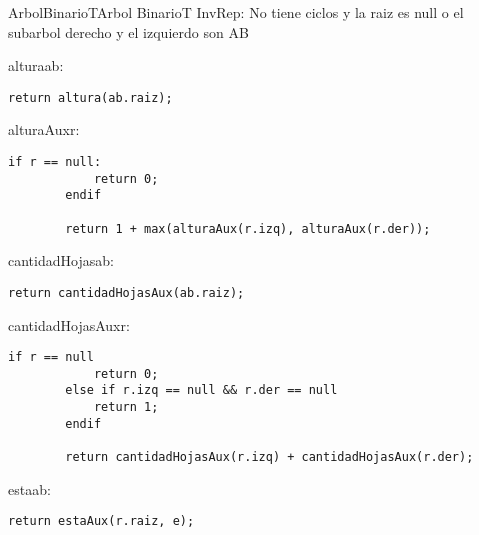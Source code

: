 \begin{module}{ArbolBinario}{T}{Arbol Binario}{T}
	\medskip
	InvRep: No tiene ciclos y la raiz es null o el subarbol derecho y el izquierdo son AB



	\begin{proc}{altura}{\In ab: \moduletype}{\Int}
		\begin{lstlisting}[numbers=none,frame=none]
		return altura(ab.raiz);
		\end{lstlisting}
	\end{proc}

	\begin{proc}{alturaAux}{\In r: \nodo}{\Int}
		\begin{lstlisting}[numbers=none,frame=none]
		if r == null:
			return 0;
		endif
	
		return 1 + max(alturaAux(r.izq), alturaAux(r.der));
		\end{lstlisting}
	\end{proc}

	\begin{proc}{cantidadHojas}{\In ab: \moduletype}{\Int}
		\begin{lstlisting}[numbers=none,frame=none]
		return cantidadHojasAux(ab.raiz);
		\end{lstlisting}
	\end{proc}

	\begin{proc}{cantidadHojasAux}{\In r: \nodo}{\Int}
		\begin{lstlisting}[numbers=none,frame=none]
		if r == null
			return 0;
		else if r.izq == null && r.der == null
			return 1;
		endif

		return cantidadHojasAux(r.izq) + cantidadHojasAux(r.der);
		\end{lstlisting}
	\end{proc}

	\pagebreak

	\begin{proc}{esta}{\In ab: \moduletype}{\bool}
		\begin{lstlisting}[numbers=none,frame=none]
		return estaAux(r.raiz, e);
		\end{lstlisting}
	\end{proc}


\end{module}
